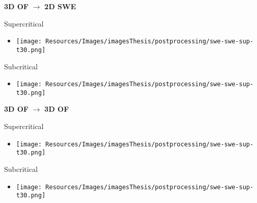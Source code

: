 \begin{frame}
\large \textbf{3D OF} $ \rightarrow$ \textbf{2D SWE}\\[1.0cm]
\begin{minipage}{0.45\textwidth}
\centering
Supercritical
\begin{itemize}
\item<2->[]
\texttt{[image: Resources/Images/imagesThesis/postprocessing/swe-swe-sup-t30.png]}
\end{itemize}
\end{minipage}
\begin{minipage}{0.45\textwidth}
\centering
Subcritical\\
\begin{itemize}
\item<3->[]
\centering
\texttt{[image: Resources/Images/imagesThesis/postprocessing/swe-swe-sup-t30.png]}
\end{itemize}
\end{minipage}
\end{frame}



\begin{frame}
\large \textbf{3D OF} $ \rightarrow$ \textbf{3D OF}\\[1.0cm]
\begin{minipage}{0.45\textwidth}
\centering
Supercritical
\begin{itemize}
\item<2->[]
\texttt{[image: Resources/Images/imagesThesis/postprocessing/swe-swe-sup-t30.png]}
\end{itemize}
\end{minipage}
\begin{minipage}{0.45\textwidth}
\centering
Subcritical\\
\begin{itemize}
\item<3->[]
\centering
\texttt{[image: Resources/Images/imagesThesis/postprocessing/swe-swe-sup-t30.png]}
\end{itemize}
\end{minipage}
\end{frame}


